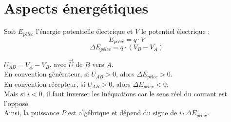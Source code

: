 \documentclass[13pt, twoside, a4paper, french]{report}
\begin{document}
  
  \section{Aspects énergétiques}\label{sec:aspects-energetiques}

    Soit $E_{pélec}$ l'énergie potentielle électrique et $V$ le potentiel électrique :
    \begin{equation}
      E_{pélec} = q \cdot V\label{eq:equation1}
    \end{equation}
    \begin{equation}
      \Delta E_{pélec} = q \cdot (V_B - V_A) \label{eq:equation2}
    \end{equation}
    
    $U_{AB} = V_A - V_B$, avec $\vec U$ de $B$ vers $A$.\\
    En convention générateur, si $U_{AB} > 0$, alors $\Delta E_{pélec} > 0$.\\
    En convention récepteur, si $U_{AB} > 0$, alors $\Delta E_{pélec} < 0$.\\

    Mais si $i < 0$, il faut inverser les inéquations car le sens réel du courant est l'opposé.\\
    
    Ainsi, la puissance $P$ est algébrique et dépend du signe de $i \cdot \Delta E_{pélec}$.
    
\end{document}
